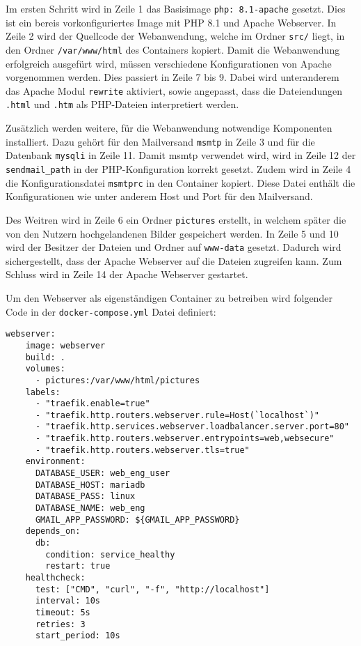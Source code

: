 Im ersten Schritt wird in Zeile 1 das Basisimage \lstinline|php: 8.1-apache| gesetzt. Dies ist ein bereis vorkonfiguriertes
Image mit PHP 8.1 und Apache Webserver. In Zeile 2 wird der Quellcode der Webanwendung, welche im Ordner \lstinline|src/| liegt,
in den Ordner \lstinline|/var/www/html| des Containers kopiert. Damit die Webanwendung erfolgreich ausgefürt wird, müssen
verschiedene Konfigurationen von Apache vorgenommen werden. Dies passiert in Zeile 7 bis 9. Dabei wird unteranderem das Apache
Modul \lstinline|rewrite| aktiviert, sowie angepasst, dass die Dateiendungen \lstinline|.html| und \lstinline|.htm| als PHP-Dateien
interpretiert werden.


Zusätzlich werden weitere, für die Webanwendung notwendige Komponenten installiert. Dazu gehört für den Mailversand
\lstinline|msmtp| in Zeile 3 und für die Datenbank \lstinline|mysqli| in Zeile 11. Damit msmtp verwendet wird,
wird in Zeile 12 der \lstinline|sendmail_path| in der PHP-Konfiguration korrekt gesetzt. Zudem wird in Zeile 4
die Konfigurationsdatei \lstinline|msmtprc| in den Container kopiert. Diese Datei enthält die Konfigurationen wie unter
anderem Host und Port für den Mailversand.

Des Weitren wird in Zeile 6 ein Ordner \lstinline|pictures| erstellt, in welchem später die von den Nutzern hochgelandenen
Bilder gespeichert werden. In Zeile 5 und 10 wird der Besitzer der Dateien  und Ordner auf \lstinline|www-data| gesetzt.
Dadurch wird sichergestellt, dass der Apache Webserver auf die Dateien zugreifen kann.
Zum Schluss wird in Zeile 14 der Apache Webserver gestartet.


Um den Webserver als eigenständigen Container zu betreiben wird folgender Code in der \lstinline|docker-compose.yml| Datei
definiert:
\begin{lstlisting}[caption={\texttt{docker-compose.yml}},captionpos=b]
    webserver:
    image: webserver
    build: .
    volumes:
      - pictures:/var/www/html/pictures
    labels:
      - "traefik.enable=true"
      - "traefik.http.routers.webserver.rule=Host(`localhost`)"
      - "traefik.http.services.webserver.loadbalancer.server.port=80"
      - "traefik.http.routers.webserver.entrypoints=web,websecure"
      - "traefik.http.routers.webserver.tls=true"
    environment:
      DATABASE_USER: web_eng_user
      DATABASE_HOST: mariadb
      DATABASE_PASS: linux
      DATABASE_NAME: web_eng
      GMAIL_APP_PASSWORD: ${GMAIL_APP_PASSWORD}
    depends_on:
      db:
        condition: service_healthy
        restart: true
    healthcheck:
      test: ["CMD", "curl", "-f", "http://localhost"]
      interval: 10s
      timeout: 5s
      retries: 3
      start_period: 10s
\end{lstlisting}

